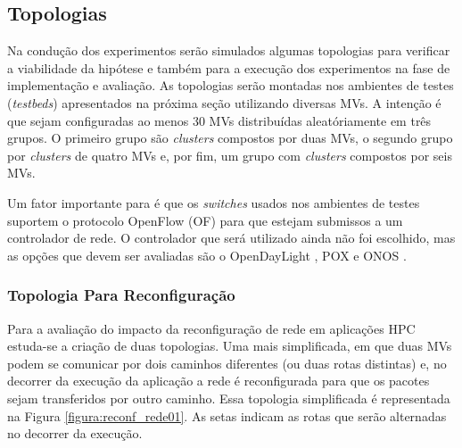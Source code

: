 \documentclass[10pt, conference, compsocconf]{IEEEtran}
\begin{document}
\begin{table}[h!]
\caption{Métricas para estudo de viabilidade.}
\label{tabela:metricas_viabilidade}
\end{table}

\subsection{Topologias}
Na condução dos experimentos serão simulados algumas topologias para verificar a viabilidade da hipótese e também para a execução dos experimentos na fase de implementação e avaliação. As topologias serão montadas nos ambientes de testes (\textit{testbeds}) apresentados na próxima seção utilizando diversas MVs. A intenção é que sejam configuradas ao menos 30 MVs distribuídas aleatóriamente em três grupos. O primeiro grupo são \textit{clusters} compostos por duas MVs, o segundo grupo por \textit{clusters} de quatro MVs e, por fim, um grupo com \textit{clusters} compostos por seis MVs.

Um fator importante para é que os \textit{switches} usados nos ambientes de testes suportem o protocolo OpenFlow (OF) para que estejam submissos a um controlador de rede. O controlador que será utilizado ainda não foi escolhido, mas as opções que devem ser avaliadas são o OpenDayLight \cite{Medvel:2013}, POX \cite{Rodrigues2014} e ONOS \cite{Berde:2014}.

\subsubsection{Topologia Para Reconfiguração}
Para a avaliação do impacto da reconfiguração de rede em aplicações HPC estuda-se a criação de duas topologias. Uma mais simplificada, em que duas MVs podem se comunicar por dois caminhos diferentes (ou duas rotas distintas) e, no decorrer da execução da aplicação a rede é reconfigurada para que os pacotes sejam transferidos por outro caminho. Essa topologia simplificada é representada na Figura \ref{figura:reconf_rede01}. As setas indicam as rotas que serão alternadas no decorrer da execução. 
\end{document}
